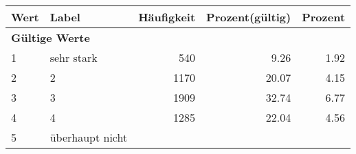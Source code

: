      \begin{longtable}{lXrrr}
     \toprule
     \textbf{Wert} & \textbf{Label} & \textbf{Häufigkeit} & \textbf{Prozent(gültig)} & \textbf{Prozent} \\
     \endhead
     \midrule
     \multicolumn{5}{l}{\textbf{Gültige Werte}}\\

     1 &
     \multicolumn{1}{X}{ sehr stark   } &


       \num{540} &
       \num[round-mode=places,round-precision=2]{9.26} &
         \num[round-mode=places,round-precision=2]{1.92} \\

     2 &
     \multicolumn{1}{X}{ 2   } &


       \num{1170} &
       \num[round-mode=places,round-precision=2]{20.07} &
         \num[round-mode=places,round-precision=2]{4.15} \\

     3 &
     \multicolumn{1}{X}{ 3   } &


       \num{1909} &
       \num[round-mode=places,round-precision=2]{32.74} &
         \num[round-mode=places,round-precision=2]{6.77} \\

     4 &
     \multicolumn{1}{X}{ 4   } &


       \num{1285} &
       \num[round-mode=places,round-precision=2]{22.04} &
         \num[round-mode=places,round-precision=2]{4.56} \\

     5 &
     \multicolumn{1}{X}{ überhaupt nicht   } &



\end{longtable}
